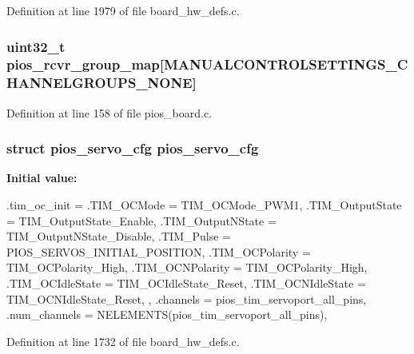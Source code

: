 \-Definition at line 1979 of file board\-\_\-hw\-\_\-defs.\-c.

\hypertarget{group___quanton_ga6c6cfc16eb738e47c123298e062297e2}{
\subsubsection[{pios\-\_\-rcvr\-\_\-group\-\_\-map}]{\setlength{\rightskip}{0pt plus 5cm}uint32\-\_\-t {\bf pios\-\_\-rcvr\-\_\-group\-\_\-map}\mbox{[}{\bf \-M\-A\-N\-U\-A\-L\-C\-O\-N\-T\-R\-O\-L\-S\-E\-T\-T\-I\-N\-G\-S\-\_\-\-C\-H\-A\-N\-N\-E\-L\-G\-R\-O\-U\-P\-S\-\_\-\-N\-O\-N\-E}\mbox{]}}}\label{group___quanton_ga6c6cfc16eb738e47c123298e062297e2}


\-Definition at line 158 of file pios\-\_\-board.\-c.

\hypertarget{group___quanton_ga57a87ef16d7949a9cc3589efc8d88a28}{
\subsubsection[{pios\-\_\-servo\-\_\-cfg}]{\setlength{\rightskip}{0pt plus 5cm}struct {\bf pios\-\_\-servo\-\_\-cfg} {\bf pios\-\_\-servo\-\_\-cfg}}}\label{group___quanton_ga57a87ef16d7949a9cc3589efc8d88a28}
{\bfseries \-Initial value\-:}
\begin{DoxyCode}
 {
        .tim_oc_init = {
                .TIM_OCMode = TIM_OCMode_PWM1,
                .TIM_OutputState = TIM_OutputState_Enable,
                .TIM_OutputNState = TIM_OutputNState_Disable,
                .TIM_Pulse = PIOS_SERVOS_INITIAL_POSITION,
                .TIM_OCPolarity = TIM_OCPolarity_High,
                .TIM_OCNPolarity = TIM_OCPolarity_High,
                .TIM_OCIdleState = TIM_OCIdleState_Reset,
                .TIM_OCNIdleState = TIM_OCNIdleState_Reset,
        },
        .channels = pios_tim_servoport_all_pins,
        .num_channels = NELEMENTS(pios_tim_servoport_all_pins),
}
\end{DoxyCode}


\-Definition at line 1732 of file board\-\_\-hw\-\_\-defs.\-c.


